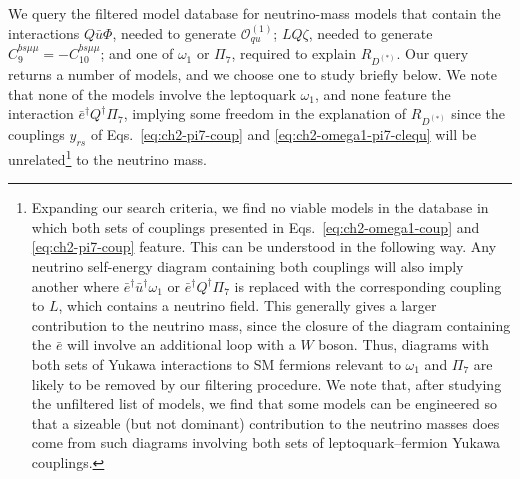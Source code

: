We query the filtered model database for neutrino-mass models that contain the
interactions $Q \bar{u} \Phi$, needed to generate $\mathcal{O}_{qu}^{(1)}$;
$LQ\zeta$, needed to generate $C_{9}^{bs\mu\mu} = -C_{10}^{bs\mu\mu}$; and one
of $\omega_{1}$ or $\Pi_{7}$, required to explain $R_{D^{(*)}}$. Our query
returns a number of models, and we choose one to study briefly below. We note
that none of the models involve the leptoquark $\omega_{1}$, and none feature
the interaction $\bar{e}^{\dagger} Q^{\dagger} \Pi_{7}$, implying some freedom
in the explanation of $R_{D^{(*)}}$ since the couplings $y_{rs}$ of
Eqs.~\eqref{eq:ch2-pi7-coup} and \eqref{eq:ch2-omega1-pi7-clequ} will be
unrelated\footnote{Expanding our search criteria, we find no viable models in
  the database in which both sets of couplings presented in
  Eqs.~\eqref{eq:ch2-omega1-coup} and \eqref{eq:ch2-pi7-coup} feature. This can be
  understood in the following way. Any neutrino self-energy diagram containing
  both couplings will also imply another where
  $\bar{e}^{\dagger} \bar{u}^\dagger \omega_{1}$ or
  $\bar{e}^{\dagger} Q^{\dagger} \Pi_{7}$ is replaced with the corresponding
  coupling to $L$, which contains a neutrino field. This generally gives a
  larger contribution to the neutrino mass, since the closure of the diagram
  containing the $\bar{e}$ will involve an additional loop with a $W$ boson.
  Thus, diagrams with both sets of Yukawa interactions to SM fermions relevant
  to $\omega_{1}$ and $\Pi_{7}$ are likely to be removed by our filtering
  procedure. We note that, after studying the unfiltered list of models, we find
  that some models can be engineered so that a sizeable (but not dominant)
  contribution to the neutrino masses does come from such diagrams involving
  both sets of leptoquark--fermion Yukawa couplings.} to the neutrino mass.

